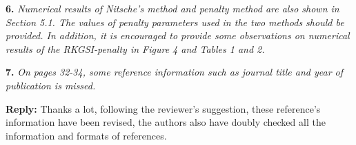 \documentclass{article}
\begin{document}
\textbf{6.} \textit{Numerical results of Nitsche's method and penalty method are also shown in Section 5.1. The values of penalty parameters used in the two methods should be provided. In addition, it is encouraged to provide some observations on numerical results of the RKGSI-penalty in Figure 4 and Tables 1 and 2.}

\textbf{7.} \textit{On pages 32-34, some reference information such as journal title and year of publication is missed.}

\textbf{Reply:} Thanks a lot, following the reviewer's suggestion, these reference's information have been revised, the authors also have doubly checked all the information and formats of references.
\end{document}
